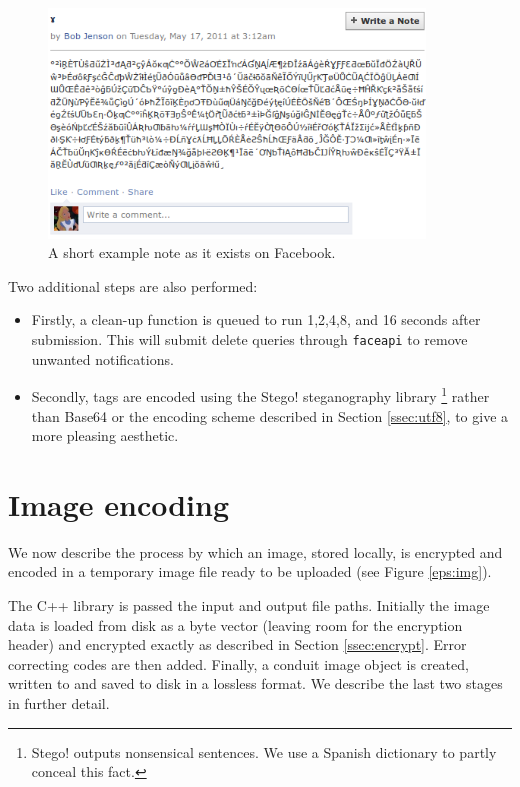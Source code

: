     \begin{figure}[tbph]
        \begin{center}
                \includegraphics[width=10cm]{screens/note.png}
            \caption{A short example note as it exists on Facebook.}
            \label{scn:note}
        \end{center}
    \end{figure}

Two additional steps are also performed:

\begin{itemize}
    \item Firstly, a clean-up function is queued to run 1,2,4,8, and 16 seconds after submission. This will submit delete queries through {\tt faceapi} to remove unwanted notifications.
    
    \item Secondly, tags are encoded using the Stego! steganography library \footnote{Stego! outputs nonsensical sentences. We use a Spanish dictionary to partly conceal this fact.} rather than Base64 or the encoding scheme described in Section \ref{ssec:utf8}, to give a more pleasing aesthetic.
\end{itemize}

\FloatBarrier
\section{Image encoding}
\label{sec:img-sub}

We now describe the process by which an image, stored locally, is encrypted and encoded in a temporary image file ready to be uploaded (see Figure \ref{eps:img}).

The C++ library is passed the input and output file paths. Initially the image data is loaded from disk as a byte vector (leaving room for the encryption header) and encrypted exactly as described in Section \ref{ssec:encrypt}. Error correcting codes are then added. Finally, a conduit image object is created, written to and saved to disk in a lossless format. We describe the last two stages in further detail.

